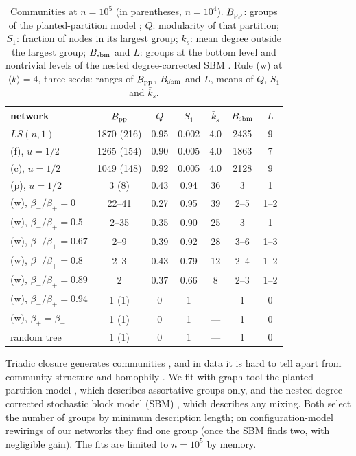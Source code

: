 \documentclass[aps,pre,twocolumn,superscriptaddress,floatfix,nofootinbib]{revtex4-2}
\begin{document}
\begin{table}[b]
\caption{Communities at $n=10^5$ (in parentheses, $n=10^4$). $B_{\rm pp}$:
groups of the planted-partition model \cite{zhang2020}; $Q$: modularity of that
partition; $S_1$: fraction of nodes in its largest group; $\bar k_s$: mean
degree outside the largest group; $B_{\rm sbm}$ and $L$: groups at the bottom
level and nontrivial levels of the nested degree-corrected SBM
\cite{peixoto2014}. Rule (w) at $\langle k\rangle=4$, three seeds: ranges of
$B_{\rm pp}$, $B_{\rm sbm}$ and $L$, means of $Q$, $S_1$ and $\bar k_s$.}
\label{tab:comm}
\begin{ruledtabular}
\begin{tabular}{lcccccc}
network & $B_{\rm pp}$ & $Q$ & $S_1$ & $\bar k_s$ & $B_{\rm sbm}$ & $L$\\
\hline
$LS(n,1)$ & 1870 (216) & 0.95 & 0.002 & 4.0 & 2435 & 9\\
(f), $u=1/2$ & 1265 (154) & 0.90 & 0.005 & 4.0 & 1863 & 7\\
(c), $u=1/2$ & 1049 (148) & 0.92 & 0.005 & 4.0 & 2128 & 9\\
(p), $u=1/2$ & 3 (8) & 0.43 & 0.94 & 36 & 3 & 1\\
(w), $\beta_-/\beta_+=0$ & 22--41 & 0.27 & 0.95 & 39 & 2--5 & 1--2\\
(w), $\beta_-/\beta_+=0.5$ & 2--35 & 0.35 & 0.90 & 25 & 3 & 1\\
(w), $\beta_-/\beta_+=0.67$ & 2--9 & 0.39 & 0.92 & 28 & 3--6 & 1--3\\
(w), $\beta_-/\beta_+=0.8$ & 2--3 & 0.43 & 0.79 & 12 & 2--4 & 1--2\\
(w), $\beta_-/\beta_+=0.89$ & 2 & 0.37 & 0.66 & 8 & 2--3 & 1--2\\
(w), $\beta_-/\beta_+=0.94$ & 1 (1) & 0 & 1 & --- & 1 & 0\\
(w), $\beta_+=\beta_-$ & 1 (1) & 0 & 1 & --- & 1 & 0\\
random tree & 1 (1) & 0 & 1 & --- & 1 & 0\\
\end{tabular}
\end{ruledtabular}
\end{table}

Triadic closure generates communities \cite{jin2001,bianconi2014}, and in
data it is hard to tell apart from community structure and homophily
\cite{asikainen2020,peixoto2022}. We fit with graph-tool
\cite{peixoto_graphtool} the planted-partition model \cite{zhang2020}, which
describes assortative groups only, and the nested degree-corrected stochastic
block model (SBM) \cite{karrer2011,peixoto2014}, which describes any mixing.
Both select the number of groups by minimum description length; on
configuration-model rewirings of our networks they find one group (once the SBM
finds two, with negligible gain). The fits are limited to $n=10^5$ by memory.
\end{document}
